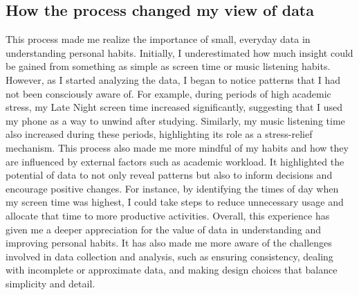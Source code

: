 \documentclass[24pt]{article}
\begin{document}
\subsection*{How the process changed my view of data}
This process made me realize the importance of small, everyday data in understanding personal habits. Initially, I underestimated how much insight could be gained from something as simple as screen time or music listening habits. However, as I started analyzing the data, I began to notice patterns that I had not been consciously aware of. For example, during periods of high academic stress, my Late Night screen time increased significantly, suggesting that I used my phone as a way to unwind after studying. Similarly, my music listening time also increased during these periods, highlighting its role as a stress-relief mechanism. This process also made me more mindful of my habits and how they are influenced by external factors such as academic workload. It highlighted the potential of data to not only reveal patterns but also to inform decisions and encourage positive changes. For instance, by identifying the times of day when my screen time was highest, I could take steps to reduce unnecessary usage and allocate that time to more productive activities. Overall, this experience has given me a deeper appreciation for the value of data in understanding and improving personal habits. It has also made me more aware of the challenges involved in data collection and analysis, such as ensuring consistency, dealing with incomplete or approximate data, and making design choices that balance simplicity and detail.
\end{document}
